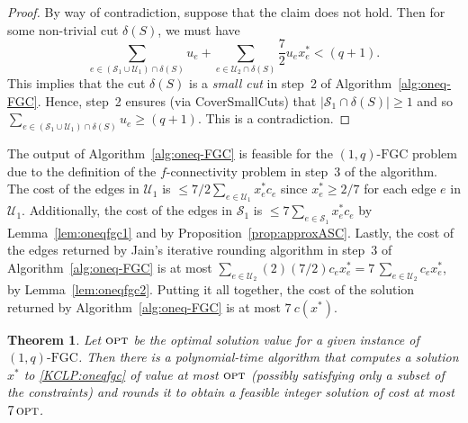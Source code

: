 \documentclass[11pt]{article}
\newtheorem{theorem}{Theorem}
\newcommand{\opt}{\textsc{opt}}
\newcommand{\safe}{\mathscr{S}}
\newcommand{\unsafe}{\mathscr{U}}
\newcommand{\fgc}{\mathrm{FGC}}
\newcommand{\oneqfgc}{(1,q)\text{-}\fgc}
\newcommand{\oneqfgcapx}{7}
\begin{document}
{{\begin{proof}
By way of contradiction, suppose that the claim does not hold.  Then
for some non-trivial cut $\delta(S)$, we must have
\[
\sum_{e\in (\safe_1 \cup \unsafe_{1})\cap\delta(S)}u_e +
	\sum_{e\in \unsafe_{2}\cap\delta(S)}  \frac{7}{2} u_e x^*_e < (q+1).
\]
This implies that the cut $\delta(S)$ is a {\em small cut} in step~2 of
Algorithm~\ref{alg:oneq-FGC}. Hence, step~2 ensures (via CoverSmallCuts)
that $|\safe_1\cap\delta(S)| \geq 1$ and so
$\sum_{e\in (\safe_1 \cup \unsafe_{1})\cap\delta(S)}u_e \geq (q+1)$.
This is a contradiction.
\end{proof}

The output of Algorithm~\ref{alg:oneq-FGC} is feasible for the
$\oneqfgc$ problem due to the definition of the $f$-connectivity
problem in step~3 of the algorithm. The cost of the edges in
$\unsafe_{1}$ is $\leq {7/2} \sum_{e\in \unsafe_{1}}x^*_e c_e$ since
$x^*_e \geq 2/7$ for each edge $e$ in $\unsafe_{1}$. Additionally,
the cost of the edges in $\safe_1$ is $\leq 7 \sum_{e\in \safe_1}x^*_e c_e$
by Lemma~\ref{lem:oneqfgc1} and by Proposition~\ref{prop:approxASC}.
Lastly, the cost of the edges returned by Jain's iterative rounding
algorithm in step~3 of Algorithm~\ref{alg:oneq-FGC} is at most
$\sum_{e\in \unsafe_{2}}(2)(7/2) c_e x^*_e = 7\,\sum_{e\in \unsafe_{2}}c_e x^*_e$,
by Lemma~\ref{lem:oneqfgc2}.
Putting it all together, the cost of the solution returned by
Algorithm~\ref{alg:oneq-FGC} is at most $\oneqfgcapx\ c(x^*)$.
}


\begin{theorem} \label{thm:approx-oneqfgc}
Let $\opt$ be the optimal solution value for a given instance of $\oneqfgc$. Then there is a polynomial-time algorithm that computes a solution $x^*$ to \eqref{KCLP:oneqfgc} of value at most $\opt$ (possibly satisfying only a subset of the constraints) and rounds it to obtain a feasible integer solution of cost at most $\oneqfgcapx\, \opt$.
\end{theorem}
}
\end{document}

